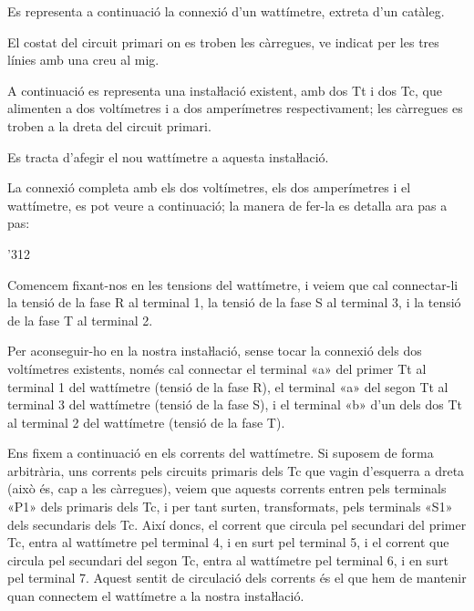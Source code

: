 \begin{exemple}
    Es representa a continuació la connexió d'un wattímetre, extreta
    d'un catàleg.

    El costat del circuit primari on es troben les càrregues, ve indicat
    per les tres línies amb una creu al mig.

    \begin{center}
        
    \end{center}

    A continuació es representa una instaŀlació existent, amb dos Tt i
    dos Tc, que alimenten a dos voltímetres i a dos amperímetres
    respectivament; les càrregues es troben a la dreta del circuit
    primari.

    \begin{center}
        
    \end{center}

    Es tracta d'afegir el nou wattímetre a aquesta
    instaŀlació.

    La connexió completa amb els dos voltímetres, els dos amperímetres i el wattímetre, es pot veure a continuació; la manera de fer-la es detalla ara pas a pas:

    \begin{dingautolist}{'312}

    \item Comencem fixant-nos en les tensions del wattímetre, i veiem que cal
    connectar-li la tensió de la fase R al terminal 1, la tensió de la
    fase S al terminal 3, i la tensió de la fase T al terminal 2.

    Per aconseguir-ho en la nostra instaŀlació, sense tocar la
    connexió dels dos voltímetres existents, només cal connectar
    el terminal «\textsf{a}» del primer Tt al terminal 1 del wattímetre (tensió de
    la fase R), el terminal «\textsf{a}» del segon Tt al terminal 3 del wattímetre
    (tensió de la fase S), i el terminal «\textsf{b}» d'un dels dos Tt
    al terminal 2 del wattímetre (tensió de la fase T).

    \item Ens fixem a continuació en els corrents del wattímetre. Si suposem
    de forma arbitrària, uns corrents pels circuits primaris dels Tc
    que vagin d'esquerra a dreta (això és, cap a les càrregues), veiem
    que aquests corrents entren pels terminals «\textsf{P1}» dels primaris dels Tc,
    i per tant surten, transformats, pels terminals «\textsf{S1}» dels secundaris
    dels Tc. Així doncs, el corrent que circula pel secundari del primer
    Tc, entra al wattímetre pel terminal 4, i en surt pel terminal 5, i
    el corrent que circula pel secundari del segon Tc, entra al
    wattímetre pel terminal 6, i en surt pel terminal 7. Aquest sentit
    de circulació dels corrents és el que hem de mantenir quan
    connectem el wattímetre a la nostra instaŀlació.


\end{dingautolist}
\end{exemple}
